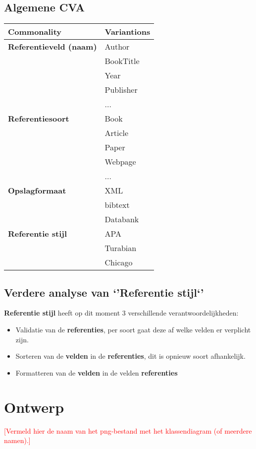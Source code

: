 \documentclass[a4paper]{article}
\newcommand{\todo}[1]{\textcolor{red}{[#1]}}
\begin{document}
\subsection{Algemene CVA}
\begin{tabularx}{\textwidth}{ | l | X |}
	\hline
	\textbf{Commonality} & \textbf{Variantions}\\ \hline
	\textbf{Referentieveld (naam)} & Author\\
	  & BookTitle\\ 
	  & Year\\ 
	  & Publisher\\ 
	  & ...\\ \hline
	\textbf{Referentiesoort} & Book\\
	  & Article\\ 
	  & Paper\\ 
	  & Webpage\\ 
	  & ...\\ \hline
	\textbf{Opslagformaat} & XML\\
	  & bibtext\\ 
	  & Databank\\ \hline
	\textbf{Referentie stijl} & APA\\
	  & Turabian\\ 
	  & Chicago\\ \hline
\end{tabularx}

\subsection{Verdere analyse van `'Referentie stijl`'}
\textbf{Referentie stijl} heeft op dit moment 3 verschillende verantwoordelijkheden:
\begin{itemize}
	\item Validatie van de \textbf{referenties}, per soort gaat deze af welke velden er verplicht zijn.
	\item Sorteren van de \textbf{velden} in de \textbf{referenties}, dit is opnieuw soort afhankelijk.
	\item Formatteren van de \textbf{velden} in de velden \textbf{referenties}
\end{itemize}

 

\section{Ontwerp}
\todo{Vermeld hier de naam van het png-bestand met het klassendiagram (of meerdere namen).}
\end{document}
